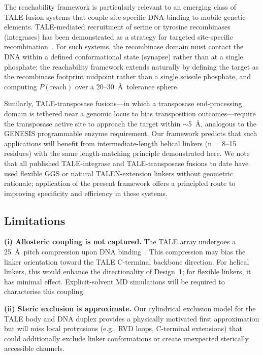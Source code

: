 \documentclass[11pt,a4paper]{article}
\newcommand{\angstrom}{\AA}
\newcommand{\preach}{P(\mathrm{reach})}
\begin{document}
The reachability framework is particularly relevant to an emerging class of
TALE-fusion systems that couple site-specific DNA-binding to mobile genetic elements.
TALE-mediated recruitment of serine or tyrosine recombinases (integrases) has been
demonstrated as a strategy for targeted site-specific recombination~\citep{Yanik2013}.
For such systems, the recombinase domain must contact the DNA within a defined conformational
state (synapse) rather than at a single phosphate; the reachability framework extends
naturally by defining the target as the recombinase footprint midpoint rather than a
single scissile phosphate, and computing $\preach$ over a 20--30~\AA\ tolerance sphere.

Similarly, TALE-transposase fusions---in which a transposase end-processing domain is
tethered near a genomic locus to bias transposition outcomes---require the transposase
active site to approach the target within $\sim$5~\AA, analogous to the GENESIS
programmable enzyme requirement. Our framework predicts that such applications will
benefit from intermediate-length helical linkers (n = 8--15 residues) with the
same length-matching principle demonstrated here. We note that all published TALE-integrase
and TALE-transposase fusions to date have used flexible GGS or natural TALEN-extension
linkers without geometric rationale; application of the present framework offers a
principled route to improving specificity and efficiency in these systems.

\subsection{Limitations}

\textbf{(i) Allosteric coupling is not captured.} The TALE array undergoes a 25~\angstrom\
pitch compression upon DNA binding~\citep{Mak2012}. This compression may bias the linker
orientation toward the TALE C-terminal backbone direction. For helical linkers, this would
enhance the directionality of Design~1; for flexible linkers, it has minimal effect.
Explicit-solvent MD simulations will be required to characterise this coupling.

\textbf{(ii) Steric exclusion is approximate.} Our cylindrical exclusion model for the TALE
body and DNA duplex provides a physically motivated first approximation but will miss
local protrusions (e.g., RVD loops, C-terminal extensions) that could additionally exclude
linker conformations or create unexpected sterically accessible channels.
\end{document}
